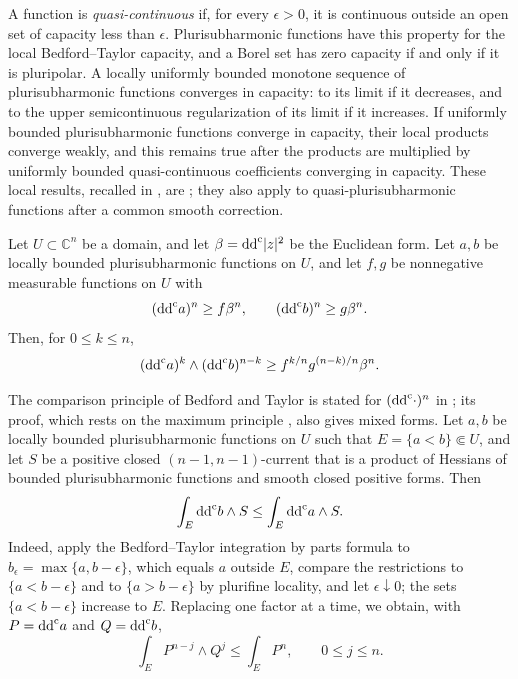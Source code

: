 A function is \emph{quasi-continuous} if, for every $\epsilon>0$, it is continuous outside an open set of capacity less than $\epsilon$. Plurisubharmonic functions have this property for the local Bedford--Taylor capacity, and a Borel set has zero capacity if and only if it is pluripolar. A locally uniformly bounded monotone sequence of plurisubharmonic functions converges in capacity: to its limit if it decreases, and to the upper semicontinuous regularization of its limit if it increases. If uniformly bounded plurisubharmonic functions converge in capacity, their local products converge weakly, and this remains true after the products are multiplied by uniformly bounded quasi-continuous coefficients converging in capacity. These local results, recalled in \cite[Section~2.3]{SGPT}, are \cite[Theorems~4.20 and~4.40, Proposition~4.25 and Theorem~4.26]{GZ17}; they also apply to quasi-plurisubharmonic functions after a common smooth correction.

\begin{theorem}\label{thm:local-mixed-input}
Let $U\subset\mathbb C^n$ be a domain, and let $\beta=\mathrm{dd}^{\mathrm{c}}|z|^2$ be the Euclidean form. Let $a,b$ be locally bounded plurisubharmonic functions on $U$, and let $f,g$ be nonnegative measurable functions on $U$ with
\[
  (\mathrm{dd}^{\mathrm{c}} a)^n\geq f\beta^n,
  \qquad
  (\mathrm{dd}^{\mathrm{c}} b)^n\geq g\beta^n.
\]
Then, for $0\leq k\leq n$,
\[
  (\mathrm{dd}^{\mathrm{c}} a)^k\wedge(\mathrm{dd}^{\mathrm{c}} b)^{n-k}
  \geq f^{k/n}g^{(n-k)/n}\beta^n.
\]
\end{theorem}

The comparison principle of Bedford and Taylor is stated for $(\mathrm{dd}^{\mathrm{c}}\cdot)^n$ in \cite[Theorem~3.29]{GZ17}; its proof, which rests on the maximum principle \cite[Theorem~3.27]{GZ17}, also gives mixed forms. Let $a,b$ be locally bounded plurisubharmonic functions on $U$ such that $E=\{a<b\}\Subset U$, and let $S$ be a positive closed $(n-1,n-1)$-current that is a product of Hessians of bounded plurisubharmonic functions and smooth closed positive forms. Then
\begin{equation}\label{eq:interior-mixed-BT-comparison}
  \int_E\mathrm{dd}^{\mathrm{c}} b\wedge S\leq\int_E\mathrm{dd}^{\mathrm{c}} a\wedge S.
\end{equation}
Indeed, apply the Bedford--Taylor integration by parts formula to $b_\epsilon=\max\{a,b-\epsilon\}$, which equals $a$ outside $E$, compare the restrictions to $\{a<b-\epsilon\}$ and to $\{a>b-\epsilon\}$ by plurifine locality, and let $\epsilon\downarrow0$; the sets $\{a<b-\epsilon\}$ increase to $E$. Replacing one factor at a time, we obtain, with $P=\mathrm{dd}^{\mathrm{c}} a$ and $Q=\mathrm{dd}^{\mathrm{c}} b$,
\begin{equation}\label{eq:interior-power-comparison}
  \int_E P^{n-j}\wedge Q^j\leq\int_E P^n,
  \qquad 0\leq j\leq n.
\end{equation}

